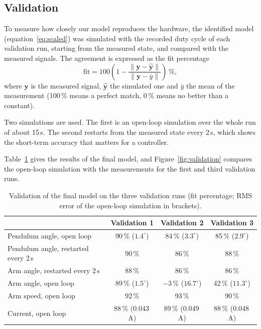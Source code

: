 \documentclass[a4paper,11pt]{article}
\begin{document}
\subsection{Validation}
To measure how closely our model reproduces the hardware, the identified model (equation~\ref{eq:scaled}) was simulated with the recorded duty cycle of each validation run, starting from the measured state, and compared with the measured signals. The agreement is expressed as the fit percentage
\begin{equation}
  \mathrm{fit} = 100 \left(1 - \frac{\lVert \mathbf{y} - \hat{\mathbf{y}} \rVert}{\lVert \mathbf{y} - \bar y \rVert}\right)\ \%,
\end{equation}
where $\mathbf{y}$ is the measured signal, $\hat{\mathbf{y}}$ the simulated one and $\bar y$ the mean of the measurement (100\,\% means a perfect match, 0\,\% means no better than a constant).

Two simulations are used. The first is an open-loop simulation over the whole run of about 15\,s. The second restarts from the measured state every 2\,s, which shows the short-term accuracy that matters for a controller.

Table~\ref{tab:validation} gives the results of the final model, and Figure~\ref{fig:validation} compares the open-loop simulation with the measurements for the first and third validation runs.

\begin{table}[h]
\centering
\caption{Validation of the final model on the three validation runs (fit percentage; RMS error of the open-loop simulation in brackets).}
\label{tab:validation}
\small
\begin{tabular}{@{}lccc@{}}
\toprule
 & Validation 1 & Validation 2 & Validation 3 \\
\midrule
Pendulum angle, open loop & 90\,\% ($1.4^\circ$) & 84\,\% ($3.3^\circ$) & 85\,\% ($2.9^\circ$) \\
Pendulum angle, restarted every 2\,s & 90\,\% & 86\,\% & 88\,\% \\
Arm angle, restarted every 2\,s & 88\,\% & 86\,\% & 86\,\% \\
Arm angle, open loop & 89\,\% ($1.5^\circ$) & $-3$\,\% ($16.7^\circ$) & 42\,\% ($11.3^\circ$) \\
Arm speed, open loop & 92\,\% & 93\,\% & 90\,\% \\
Current, open loop & 88\,\% (0.043\,A) & 89\,\% (0.049\,A) & 88\,\% (0.048\,A) \\
\bottomrule
\end{tabular}
\end{table}
\end{document}
